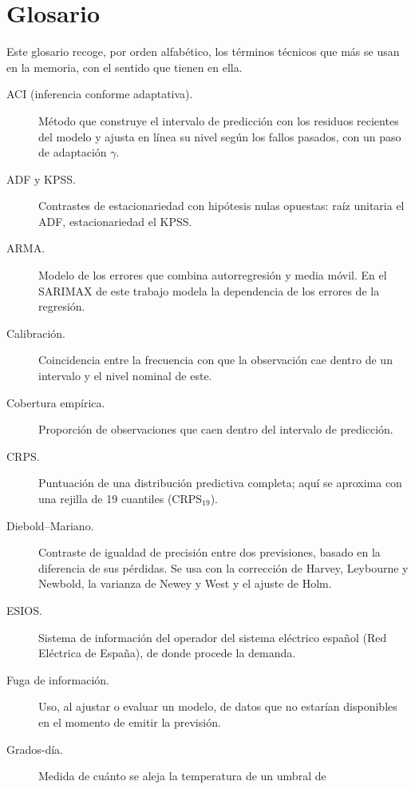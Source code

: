 \chapter*{Glosario}

Este glosario recoge, por orden alfabético, los términos técnicos que más se
usan en la memoria, con el sentido que tienen en ella.

\begin{description}
	\item[ACI (inferencia conforme adaptativa).] Método que construye el intervalo
	de predicción con los residuos recientes del modelo y ajusta en línea su nivel
	según los fallos pasados, con un paso de adaptación $\gamma$.
	\item[ADF y KPSS.] Contrastes de estacionariedad con hipótesis nulas opuestas:
	raíz unitaria el ADF, estacionariedad el KPSS.
	\item[ARMA.] Modelo de los errores que combina autorregresión y media móvil. En
	el SARIMAX de este trabajo modela la dependencia de los errores de la regresión.
	\item[Calibración.] Coincidencia entre la frecuencia con que la observación cae
	dentro de un intervalo y el nivel nominal de este.
	\item[Cobertura empírica.] Proporción de observaciones que caen dentro del
	intervalo de predicción.
	\item[CRPS.] Puntuación de una distribución predictiva completa; aquí se aproxima
	con una rejilla de 19 cuantiles (CRPS$_{19}$).
	\item[Diebold--Mariano.] Contraste de igualdad de precisión entre dos
	previsiones, basado en la diferencia de sus pérdidas. Se usa con la corrección de
	Harvey, Leybourne y Newbold, la varianza de Newey y West y el ajuste de Holm.
	\item[ESIOS.] Sistema de información del operador del sistema eléctrico español
	(Red Eléctrica de España), de donde procede la demanda.
	\item[Fuga de información.] Uso, al ajustar o evaluar un modelo, de datos que no
	estarían disponibles en el momento de emitir la previsión.
	\item[Grados-día.] Medida de cuánto se aleja la temperatura de un umbral de

\end{description}
